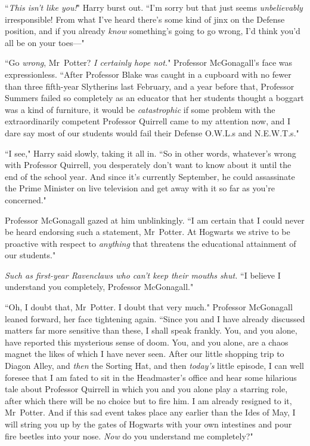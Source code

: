 ``\emph{This isn't like you!}" Harry burst out. ``I'm sorry but that just seems \emph{unbelievably} irresponsible! From what I've heard there's some kind of jinx on the Defense position, and if you already \emph{know} something's going to go wrong, I'd think you'd all be on your toes—"

``Go \emph{wrong}, Mr~Potter? \emph{I certainly hope not.}" Professor McGonagall's face was expressionless. ``After Professor Blake was caught in a cupboard with no fewer than three fifth-year Slytherins last February, and a year before that, Professor Summers failed so completely as an educator that her students thought a boggart was a kind of furniture, it would be \emph{catastrophic} if some problem with the extraordinarily competent Professor Quirrell came to my attention now, and I dare say most of our students would fail their Defense O.W.L.s and N.E.W.T.s."

``I see," Harry said slowly, taking it all in. ``So in other words, whatever's wrong with Professor Quirrell, you desperately don't want to know about it until the end of the school year. And since it's currently September, he could assassinate the Prime Minister on live television and get away with it so far as you're concerned."

Professor McGonagall gazed at him unblinkingly. ``I am certain that I could never be heard endorsing such a statement, Mr~Potter. At Hogwarts we strive to be proactive with respect to \emph{anything} that threatens the educational attainment of our students."

\emph{Such as first-year Ravenclaws who can't keep their mouths shut.} ``I believe I understand you completely, Professor McGonagall."

``Oh, I doubt that, Mr~Potter. I doubt that very much." Professor McGonagall leaned forward, her face tightening again. ``Since you and I have already discussed matters far more sensitive than these, I shall speak frankly. You, and you alone, have reported this mysterious sense of doom. You, and you alone, are a chaos magnet the likes of which I have never seen. After our little shopping trip to Diagon Alley, and \emph{then} the Sorting Hat, and then \emph{today's} little episode, I can well foresee that I am fated to sit in the Headmaster's office and hear some hilarious tale about Professor Quirrell in which you and you alone play a starring role, after which there will be no choice but to fire him. I am already resigned to it, Mr~Potter. And if this sad event takes place any earlier than the Ides of May, I will string you up by the gates of Hogwarts with your own intestines and pour fire beetles into your nose. \emph{Now} do you understand me completely?"

